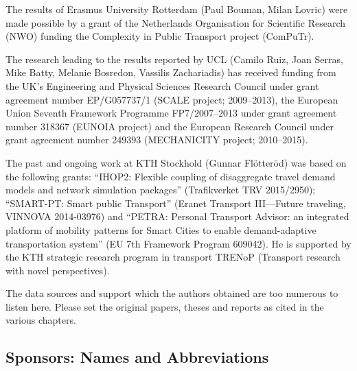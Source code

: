 The results of Erasmus University Rotterdam (Paul Bouman, Milan Lovric) were made possible by a grant of the Netherlands Organisation for Scientific Research (NWO) funding the Complexity in Public Transport project (ComPuTr). 

The research leading to the results reported by UCL (Camilo Ruiz, Joan Serras, Mike Batty, Melanie Bosredon, Vassilis Zachariadis) has received funding from the UK's Engineering and Physical Sciences Research Council under grant agreement number EP/G057737/1 (SCALE project; 2009–2013), the European Union Seventh Framework Programme FP7/2007–2013 under grant agreement number 318367 (EUNOIA project) and the European Research Council under grant agreement number 249393 (MECHANICITY project; 2010–2015).

The past and ongoing work at KTH Stockhold (Gunnar Flötteröd) was based on the following grants: 
``IHOP2: Flexible coupling of disaggregate travel demand models and network simulation packages'' (Trafikverket TRV 2015/2950); 
``SMART-PT: Smart public Transport'' (Eranet Transport III---Future traveling, VINNOVA 2014-03976) and
``PETRA: Personal Transport Advisor: an integrated platform of mobility patterns for Smart Cities to enable demand-adaptive transportation system'' (EU 7th Framework Program 609042). 
He is supported by the KTH strategic research program in transport TRENoP (Transport research with novel perspectives).

The data sources and support which the authors obtained are too numerous to listen here. Please set the original papers, theses and reports as cited in the various chapters. 

\subsection*{Sponsors: Names and Abbreviations}

